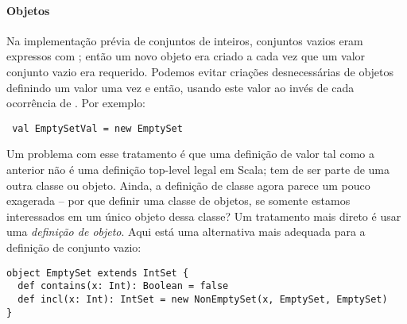 \paragraph{Objetos}
Na implementa\c{c}\~{a}o pr\'{e}via de conjuntos de inteiros, conjuntos vazios eram expressos
com ; ent\~{a}o um novo objeto era criado a cada vez que um valor
conjunto vazio era requerido. Podemos evitar cria\c{c}\~{o}es desnecess\'{a}rias de objetos 
definindo um valor  uma vez e ent\~{a}o, usando este valor ao inv\'{e}s de cada 
ocorr\^{e}ncia de . Por exemplo:
 \begin{lstlisting}
 val EmptySetVal = new EmptySet
 \end{lstlisting}
Um problema com esse tratamento \'{e} que uma defini\c{c}\~{a}o de valor tal como a anterior
n\~{a}o \'{e} uma defini\c{c}\~{a}o top-level legal em Scala; tem de ser parte de uma outra classe 
ou objeto. Ainda, a defini\c{c}\~{a}o de classe  agora parece um pouco exagerada -- 
por que definir uma classe de objetos, se somente estamos interessados em um \'{u}nico objeto 
dessa classe? Um tratamento mais direto \'{e} usar uma {\em defini\c{c}\~{a}o de objeto}. Aqui est\'{a} 
uma alternativa mais adequada para a defini\c{c}\~{a}o de conjunto vazio:
\begin{lstlisting}
object EmptySet extends IntSet {
  def contains(x: Int): Boolean = false
  def incl(x: Int): IntSet = new NonEmptySet(x, EmptySet, EmptySet)
}
\end{lstlisting}

